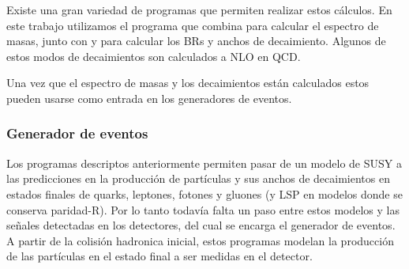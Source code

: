Existe una gran variedad de programas que permiten realizar estos cálculos.
En este trabajo utilizamos el programa
{\susyhit}\cite{Djouadi:2006bz} que combina {\suspect}\cite{Djouadi2007426}
para calcular el espectro de masas, junto
con {\sdecay}\cite{Muhlleitner:2004mka} y {\hdecay}\cite{Djouadi:1997yw}
para calcular los BRs y anchos de decaimiento. Algunos de estos modos de
decaimientos son calculados a NLO en QCD.


Una vez que el espectro de masas y los decaimientos están calculados estos
pueden usarse como entrada en los generadores de eventos.




\subsubsection{Generador de eventos}

Los programas descriptos anteriormente permiten pasar de un modelo de SUSY a las
predicciones en la producción de partículas y sus anchos de decaimientos en
estados finales de quarks, leptones, fotones y gluones (y LSP en modelos donde
se conserva paridad-R).
Por lo tanto todavía falta un paso
entre estos modelos y las señales detectadas en los detectores, del cual se
encarga el generador de eventos. A partir de la colisión hadronica inicial,
estos programas modelan la producción de las partículas en el estado final a ser
medidas en el detector.

